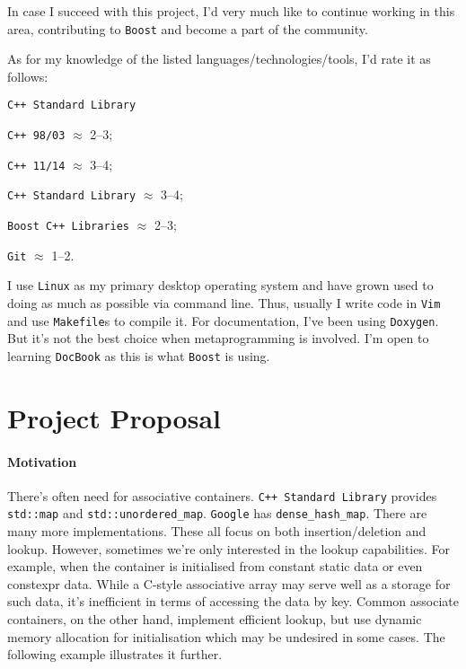 \documentclass[a4paper,12pt]{article}
\begin{document}
    In case I succeed with this project, I'd very much like to continue working in this area, contributing to \texttt{Boost} and become a part of the community.

    As for my knowledge of the listed languages/technologies/tools, I'd rate it as follows:
    \begin{labeling}{\texttt{C++ Standard Library}}
    \item [\texttt{C++ 98/03}] $\approx$ 2--3;
    \item [\texttt{C++ 11/14}] $\approx$ 3--4;
    \item [\texttt{C++ Standard Library}] $\approx$ 3--4;
    \item [\texttt{Boost C++ Libraries}] $\approx$ 2--3;
    \item [\texttt{Git}] $\approx$ 1--2.
    \end{labeling}

    I use \texttt{Linux} as my primary desktop operating system and have grown used to doing as much as possible via command line. Thus, usually I write code in \texttt{Vim} and use \texttt{Makefile}s to compile it. For documentation, I've been using \texttt{Doxygen}. But it's not the best choice when metaprogramming is involved. I'm open to learning \texttt{DocBook} as this is what \texttt{Boost} is using.

\section{Project Proposal}
   
    \paragraph{Motivation} There's often need for associative containers. \texttt{C++ Standard Library} provides \texttt{std::map} and \texttt{std::unordered\_map}. \texttt{Google} has \texttt{dense\_hash\_map}. There are many more implementations. These all focus on both insertion/deletion and lookup. However, sometimes we're only interested in the lookup capabilities. For example, when the container is initialised from constant static data or even constexpr data. While a C-style associative array may serve well as a storage for such data, it's inefficient in terms of accessing the data by key. Common associate containers, on the other hand, implement efficient lookup, but use dynamic memory allocation for initialisation which may be undesired in some cases. The following example illustrates it further.
\end{document}
